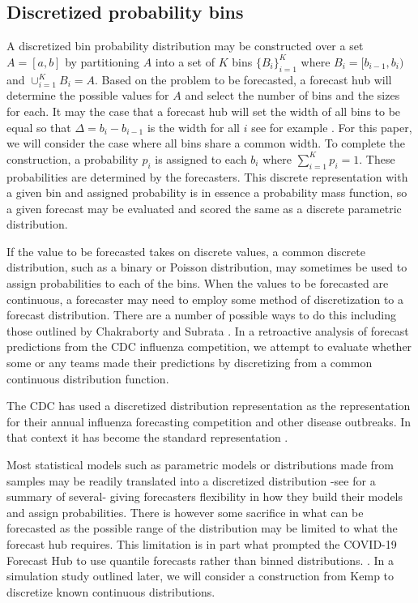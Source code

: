 \documentclass{article}\usepackage[]{graphicx}\usepackage[]{color}
\begin{document}
\subsection{Discretized probability bins}
A discretized bin probability distribution may be constructed over a set 
$A = [a, b]$ by partitioning $A$ into a set of $K$ bins $\{B_i\}_{i=1}^{K}$
where $B_i = [b_{i-1}, b_i)$ and $\cup_{i=1}^{K} B_i = A$. Based on the problem
to be forecasted, a forecast hub will determine the possible values for $A$ and 
select the number of bins and the sizes for each. It may the case
that a forecast hub will set the width of all bins to be equal so that 
$\Delta = b_i - b_{i-1}$ is the width for all $i$ see for example
\cite{mcgowan2019collaborative}. 
For this paper, we will consider the case where all bins share a common width.
To complete the construction, a probability $p_i$ is assigned to each $b_i$ 
where $\sum_{i=1}^{K}p_i = 1$. These probabilities are determined by the 
forecasters. 
This discrete representation with a given bin and assigned probability is in
essence a probability mass function, so a given forecast may be evaluated and 
scored the same as a discrete parametric distribution. 

If the value to be forecasted takes on discrete values, a common discrete 
distribution, such as a binary or Poisson distribution, may sometimes be used to 
assign probabilities to each of the bins. When the values to be forecasted are
continuous, a forecaster may need to employ some method of discretization to a 
forecast distribution. There are a number of possible ways to do this including
those outlined by Chakraborty and Subrata \cite{chakraborty2015generating}.
In a retroactive analysis of forecast predictions from the CDC influenza 
competition, we attempt to evaluate whether some or any teams made their 
predictions by discretizing from a common continuous distribution function.

The CDC has used a discretized distribution representation as the representation
for their annual influenza forecasting competition and other disease outbreaks.
In that context it has become the standard representation 
\cite{brooks2020comparing}. 

Most statistical models such as parametric models 
or distributions made from samples may be readily translated into a discretized 
distribution -see \cite{chakraborty2015generating} for a summary of several-
giving forecasters flexibility in how they build their 
models and assign probabilities. 
There is however some sacrifice in what can be 
forecasted as the possible range of the distribution may be limited to what the
forecast hub requires. This limitation is in part what prompted the COVID-19
Forecast Hub to use quantile forecasts rather than binned distributions.
\cite{bracher2021evaluating}.
In a simulation study outlined later, we will
consider a construction from Kemp \cite{kemp2004classes} to discretize known
continuous distributions.
\end{document}

